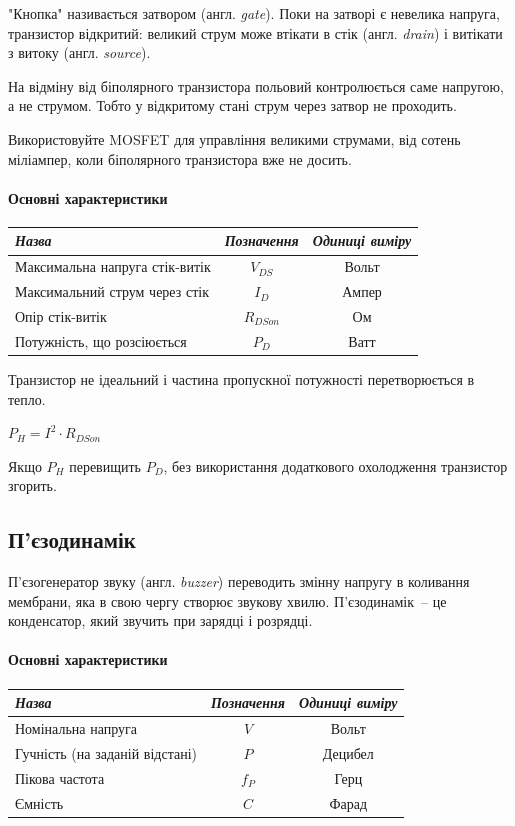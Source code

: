 \documentclass[12pt,a4paper]{report}  %
\begin{document}
"Кнопка" називається затвором (англ. \textit{gate}). Поки на затворі є невелика напруга, транзистор відкритий: великий струм може втікати в стік (англ. \textit{drain}) і витікати з витоку (англ. \textit{source}).

На відміну від біполярного транзистора польовий контролюється саме напругою, а не струмом. Тобто у відкритому стані струм через затвор не проходить.

Використовуйте MOSFET для управління великими струмами, від сотень міліампер, коли біполярного транзистора вже не досить.

\paragraph{Основні характеристики}
\begin{center}
\begin{tabular}{|l|c|c|}
\hline
\textit{Назва} & \textit{Позначення} & \textit{Одиниці виміру} \\
\hline
Максимальна напруга стік-витік & $V_{DS}$ & Вольт \\
\hline		
Максимальний струм через стік & $I_D$ & Ампер \\
\hline
Опір стік-витік & $R_{DSon}$ & Ом \\
\hline
Потужність, що розсіюється & $P_D$ & Ватт \\
\hline
\end{tabular}
\end{center}

Транзистор не ідеальний і частина пропускної потужності перетворюється в тепло.

$ P_H = I^2 \cdot R_{DSon} $

Якщо $P_H$ перевищить $P_D$, без використання додаткового охолодження транзистор згорить.

\subsection{П'єзодинамік}

П'єзогенератор звуку (англ. \textit{buzzer}) переводить змінну напругу в коливання мембрани, яка в свою чергу створює звукову хвилю. П'єзодинамік~-- це конденсатор, який звучить при зарядці і розрядці.

\paragraph{Основні характеристики}
\begin{center}
\begin{tabular}{|l|c|c|}
\hline
\textit{Назва} & \textit{Позначення} & \textit{Одиниці виміру} \\
\hline
Номінальна напруга & $V$ & Вольт \\
\hline		
Гучність (на заданій відстані) & $P$ & Децибел \\
\hline
Пікова частота & $f_P$ & Герц \\
\hline
Ємність & $C$ & Фарад \\
\hline
\end{tabular}
\end{center}
\end{document}
